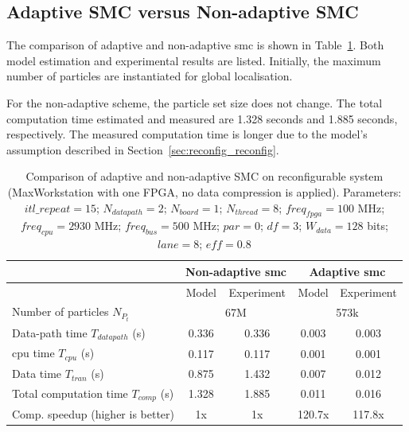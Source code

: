 \subsection{Adaptive SMC versus Non-adaptive SMC}
The comparison of adaptive and non-adaptive \gls{smc} is shown in Table~\ref{tab:smc}.
Both model estimation and experimental results are listed.
Initially, the maximum number of particles are instantiated for global localisation.

For the non-adaptive scheme, the particle set size does not change.
The total computation time estimated and measured are 1.328 seconds and 1.885 seconds, respectively.
The measured computation time is longer due to the model's assumption described in Section~\ref{sec:reconfig_reconfig}.

\begin{table}[ht]
	\centering
	\setlength{\tabcolsep}{5pt}
	\begin{spacing}{1.0}
	\caption[Comparison of adaptive and non-adaptive SMC on reconfigurable system.]{Comparison of adaptive and non-adaptive SMC on reconfigurable system (MaxWorkstation with one FPGA, no data compression is applied). Parameters: $\mathit{itl}\_{repeat} = 15$; $N_{datapath} = 2$; $N_{board} = 1$; $N_{thread} = 8$; $\mathit{freq}_{fpga} = 100$ MHz; $\mathit{freq}_{cpu} = 2930$ MHz; $\mathit{freq}_{bus} = 500$ MHz; $\mathit{par} = 0$; $df = 3$; $W_{data} = 128$ bits; $\mathit{lane} = 8$; $\mathit{eff} = 0.8$}
	\label{tab:smc}{
	\smallskip
		\begin{tabular}{l || c c | c c}
			\hline
			 \multirow{2}{*}{}  & \multicolumn{2}{c|}{Non-adaptive \gls{smc}} & \multicolumn{2}{c}{Adaptive \gls{smc}} \\
			\hline
			  & Model & Experiment & Model & Experiment \\
			\hline
			\hline
			 Number of particles $N_{P_t}$ & \multicolumn{2}{c|}{67M} & \multicolumn{2}{c}{573k} \\
			\hline
			 Data-path time $T_{datapath}$ (s) 		& 0.336 & 0.336 & 0.003 & 0.003 \\
			 \gls{cpu} time $T_{cpu}$ (s) 				& 0.117 & 0.117 & 0.001 & 0.001 \\
			 Data time $T_{tran}$ (s) 				& 0.875 & 1.432 & 0.007 & 0.012 \\
			 Total computation time $T_{comp}$ (s)			& 1.328 & 1.885 & 0.011	& 0.016 \\
			\hline
			 Comp. speedup (higher is better)		& 1x	& 1x	& 120.7x	& 117.8x \\
			\hline
		\end{tabular}
	}
	\end{spacing}
\end{table}

